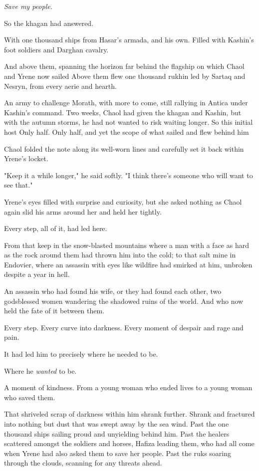 \emph{Save my people.}

So the khagan had answered.

With one thousand ships from Hasar's armada, and his own. Filled with Kashin's foot soldiers and Darghan cavalry.

And above them, spanning the horizon far behind the flagship on which Chaol and Yrene now sailed  Above them flew one thousand rukhin led by Sartaq and Nesryn, from every aerie and hearth.

An army to challenge Morath, with more to come, still rallying in Antica under Kashin's command. Two weeks, Chaol had given the khagan and Kashin, but with the autumn storms, he had not wanted to risk waiting longer. So this initial host  Only half. Only half, and yet the scope of what sailed and flew behind him 

Chaol folded the note along its well-worn lines and carefully set it back within Yrene's locket.

"Keep it a while longer," he said softly. "I think there's someone who will want to see that."

Yrene's eyes filled with surprise and curiosity, but she asked nothing as Chaol again slid his arms around her and held her tightly.

Every step, all of it, had led here.

From that keep in the snow-blasted mountains where a man with a face as hard as the rock around them had thrown him into the cold; to that salt mine in Endovier, where an assassin with eyes like wildfire had smirked at him, unbroken despite a year in hell.

An assassin who had found his wife, or they had found each other, two godsblessed women wandering the shadowed ruins of the world. And who now held the fate of it between them.

Every step. Every curve into darkness. Every moment of despair and rage and pain.

It had led him to precisely where he needed to be.

Where he \emph{wanted} to be.

A moment of kindness. From a young woman who ended lives to a young woman who saved them.

That shriveled scrap of darkness within him shrank further. Shrank and fractured into nothing but dust that was swept away by the sea wind. Past the one thousand ships sailing proud and unyielding behind him. Past the healers scattered amongst the soldiers and horses, Hafiza leading them, who had all come when Yrene had also asked them to save her people. Past the ruks soaring through the clouds, scanning for any threats ahead.

